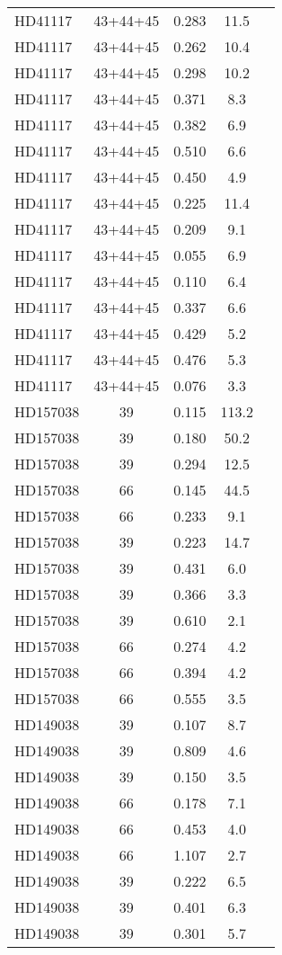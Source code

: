 \begin{table*}
\begin{tabular}{l c c c c}
HD41117 & 43+44+45 & 0.283 & 11.5\\ 
HD41117 & 43+44+45 & 0.262 & 10.4\\ 
HD41117 & 43+44+45 & 0.298 & 10.2\\ 
HD41117 & 43+44+45 & 0.371 & 8.3\\ 
HD41117 & 43+44+45 & 0.382 & 6.9\\ 
HD41117 & 43+44+45 & 0.510 & 6.6\\ 
HD41117 & 43+44+45 & 0.450 & 4.9\\ 
HD41117 & 43+44+45 & 0.225 & 11.4\\ 
HD41117 & 43+44+45 & 0.209 & 9.1\\ 
HD41117 & 43+44+45 & 0.055 & 6.9\\ 
HD41117 & 43+44+45 & 0.110 & 6.4\\ 
HD41117 & 43+44+45 & 0.337 & 6.6\\ 
HD41117 & 43+44+45 & 0.429 & 5.2\\ 
HD41117 & 43+44+45 & 0.476 & 5.3\\ 
HD41117 & 43+44+45 & 0.076 & 3.3\\ 
\hline
HD157038 & 39 & 0.115 & 113.2\\ 
HD157038 & 39 & 0.180 & 50.2\\ 
HD157038 & 39 & 0.294 & 12.5\\ 
HD157038 & 66 & 0.145 & 44.5\\ 
HD157038 & 66 & 0.233 & 9.1\\ 
HD157038 & 39 & 0.223 & 14.7\\ 
HD157038 & 39 & 0.431 & 6.0\\ 
HD157038 & 39 & 0.366 & 3.3\\ 
HD157038 & 39 & 0.610 & 2.1\\ 
HD157038 & 66 & 0.274 & 4.2\\ 
HD157038 & 66 & 0.394 & 4.2\\ 
HD157038 & 66 & 0.555 & 3.5\\ 
\hline
HD149038 & 39 & 0.107 & 8.7\\ 
HD149038 & 39 & 0.809 & 4.6\\ 
HD149038 & 39 & 0.150 & 3.5\\ 
HD149038 & 66 & 0.178 & 7.1\\ 
HD149038 & 66 & 0.453 & 4.0\\ 
HD149038 & 66 & 1.107 & 2.7\\ 
HD149038 & 39 & 0.222 & 6.5\\ 
HD149038 & 39 & 0.401 & 6.3\\ 
HD149038 & 39 & 0.301 & 5.7\\ 

\end{tabular}
\end{table*}
